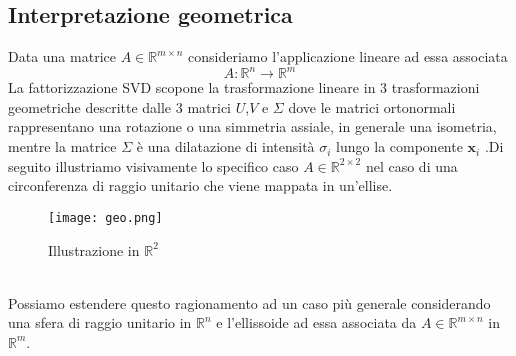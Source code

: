 \documentclass[11pt]{article}
\newcommand{\R}{\mathbb{R}} %
\begin{document}
\subsection{Interpretazione geometrica}
Data una matrice $A \in \R^{m \times n}$ consideriamo l'applicazione lineare ad essa associata $$A: \R^n \rightarrow \R^m$$
La fattorizzazione SVD scopone la trasformazione lineare in 3 trasformazioni geometriche descritte dalle 3 matrici $U$,$V$ e $\Sigma$ dove le matrici ortonormali rappresentano una rotazione o una simmetria assiale, in generale una isometria, mentre la matrice $\Sigma$ è una dilatazione di intensità $\sigma_i$ lungo la componente $\mathbf{x}_i$ .Di seguito illustriamo visivamente lo specifico caso $A \in \R^{2 \times 2}$ nel caso di una circonferenza di raggio unitario che viene mappata in un'ellise.
\begin{figure}[h]
    \centering
    \texttt{[image: geo.png]}
    \caption{Illustrazione in $\R^2$}
    \label{fig:geo}
\end{figure}
\noindent \\
Possiamo estendere questo ragionamento ad un caso più generale considerando una sfera di raggio unitario in $\R^n$ e l'ellissoide ad essa associata da $A \in \R^{m \times n}$ in $\R^m$.\\
\end{document}
